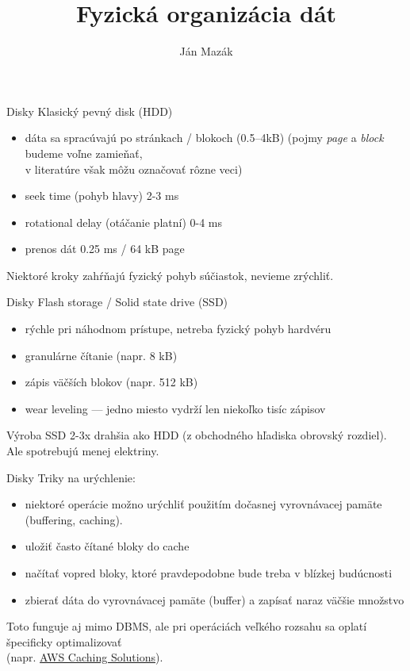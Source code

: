 \documentclass[12pt]{beamer}
\title{Fyzická organizácia dát}
\author{Ján Mazák}
\institute{FMFI UK Bratislava}
\date{}
\begin{document}
\frame{\titlepage}

\begin{frame}[fragile]{Disky}
Klasický pevný disk (HDD)
\begin{itemize}
\item dáta sa spracúvajú po stránkach / blokoch (0.5--4kB)
  (pojmy \emph{page} a \emph{block} budeme voľne zamieňať,\\ v literatúre však môžu označovať rôzne veci)
\item seek time (pohyb hlavy) 2-3 ms
\item rotational delay (otáčanie platní) 0-4 ms
\item prenos dát 0.25 ms / 64 kB page
\end{itemize}
Niektoré kroky zahŕňajú fyzický pohyb súčiastok, nevieme zrýchliť.\\
\end{frame}

\begin{frame}[fragile]{Disky}
Flash storage / Solid state drive (SSD)
\begin{itemize}
\item rýchle pri náhodnom prístupe, netreba fyzický pohyb hardvéru
\item granulárne čítanie (napr. 8 kB)
\item zápis väčších blokov (napr. 512 kB)
\item wear leveling --- jedno miesto vydrží len niekoľko tisíc zápisov
\end{itemize}
Výroba SSD 2-3x drahšia ako HDD (z obchodného hľadiska obrovský rozdiel).
Ale spotrebujú menej elektriny.
\end{frame}

\begin{frame}[fragile]{Disky}
Triky na urýchlenie:
\begin{itemize}
\item niektoré operácie možno urýchliť použitím dočasnej vyrovnávacej pamäte (buffering, caching).
\item uložiť často čítané bloky do cache
\item načítať vopred bloky, ktoré pravdepodobne bude treba v blízkej budúcnosti
\item zbierať dáta do vyrovnávacej pamäte (buffer) a zapísať naraz väčšie množstvo
\end{itemize}
Toto funguje aj mimo DBMS, ale pri operáciách veľkého rozsahu sa oplatí špecificky optimalizovať\\
(napr. \href{https://aws.amazon.com/caching/aws-caching/}{AWS Caching Solutions}).
\end{frame}
\end{document}
